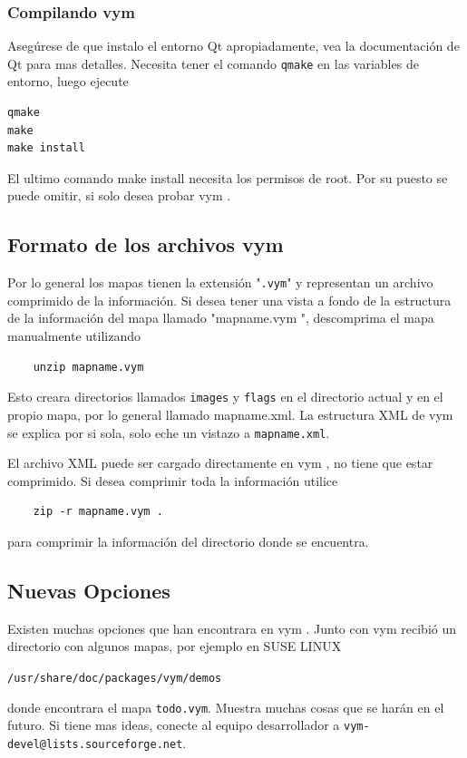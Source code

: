 \documentclass{article}
\newcommand{\vym}{{\sc vym }}
\begin{document}
\begin{appendix}
\subsubsection{Compilando \vym}
Aseg\'urese de que instalo el entorno Qt apropiadamente, vea la documentaci\'on de Qt para mas detalles. Necesita tener el comando {\tt qmake} en las variables de entorno, luego ejecute

\begin{verbatim}
qmake
make  
make install
\end{verbatim}
El ultimo comando make install necesita los permisos de root. Por su puesto se puede omitir, si solo desea probar \vym.


\subsection{Formato de los archivos \vym } \label{fileformat}
Por lo general los mapas tienen la extensi\'on "{\tt .vym}" y representan un archivo comprimido de la informaci\'on. Si desea tener una vista a fondo de la estructura de la informaci\'on del mapa llamado "mapname.\vym", descomprima el mapa manualmente utilizando
\begin{verbatim}
    unzip mapname.vym
\end{verbatim}
Esto creara directorios llamados {\tt images} y {\tt flags} en el directorio actual y en el propio mapa, por lo general llamado mapname.xml. La estructura XML de \vym se explica por si sola, solo eche un vistazo a {\tt mapname.xml}.

El archivo XML puede ser cargado directamente en \vym, no tiene que estar comprimido. Si desea comprimir toda la informaci\'on utilice
\begin{verbatim}
    zip -r mapname.vym .
\end{verbatim}
para comprimir la informaci\'on del directorio donde se encuentra.

\subsection{Nuevas Opciones}
Existen muchas opciones que han encontrara en \vym. Junto con \vym recibi\'o un directorio con algunos mapas, por ejemplo en SUSE LINUX 
\begin{center}
    {\tt /usr/share/doc/packages/vym/demos}
\end{center}
donde encontrara el mapa {\tt todo.vym}. Muestra muchas cosas que se har\'an en el futuro. Si tiene mas ideas, conecte al equipo desarrollador a 
{\tt vym-devel@lists.sourceforge.net}.



\end{appendix}
\end{document}
